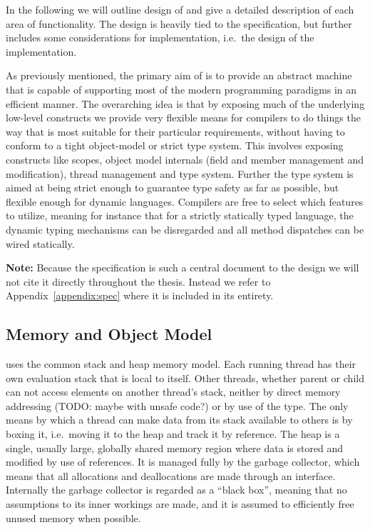 In the following we will outline  design of \thename{} and give a detailed
description of each area of functionality. The design is heavily tied to the
\thename{} specification, but further includes some considerations for
implementation, i.e.~the design of the implementation.

As previously mentioned, the primary aim of \thename{} is to provide an abstract
machine that is capable of supporting most of the modern programming paradigms
in an efficient manner. The overarching idea is that by exposing much of the
underlying low-level constructs we provide very flexible means for compilers to
do things the way that is most suitable for their particular requirements,
without having to conform to a tight object-model or strict type system. This
involves exposing constructs like scopes, object model internals (field and
member management and modification), thread management and type system. Further
the type system is aimed at being strict enough to guarantee type safety as far
as possible, but flexible enough for dynamic languages. Compilers are free to
select which features to utilize, meaning for instance that for a strictly
statically typed language, the dynamic typing mechanisms can be disregarded and
all method dispatches can be wired statically.

\textbf{Note:} Because the specification is such a central document to the
design we will not cite it directly throughout the thesis. Instead we refer to
Appendix~\ref{appendix:spec} where it is included in its entirety.

\subsection{Memory and Object Model}

\thename{} uses the common stack and heap memory model. Each running thread has
their own evaluation stack that is local to itself. Other threads, whether
parent or child can not access elements on another thread's stack, neither by
direct memory addressing (TODO: maybe with unsafe code?) or by use of the
 type. The only means by which a thread can make data from
its stack available to others is by boxing it, i.e.~moving it to the heap and
track it by reference. The heap is a single, usually large, globally shared
memory region where data is stored and modified by use of references. It is
managed fully by the garbage collector, which means that all allocations and
deallocations are made through an interface. Internally the garbage collector is
regarded as a ``black box'', meaning that no assumptions to its inner workings
are made, and it is assumed to efficiently free unused memory when possible.

